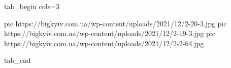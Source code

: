  
 
 
 
 


\ifcmt
  tab_begin cols=3

     pic https://bigkyiv.com.ua/wp-content/uploads/2021/12/2-20-3.jpg
     pic https://bigkyiv.com.ua/wp-content/uploads/2021/12/2-19-3.jpg
		 pic https://bigkyiv.com.ua/wp-content/uploads/2021/12/2-2-64.jpg

  tab_end
\fi
